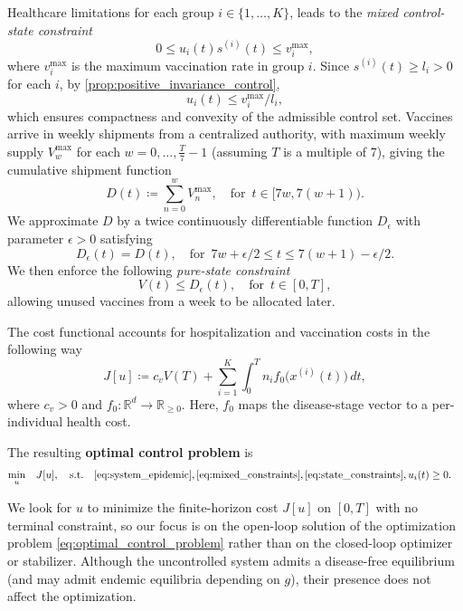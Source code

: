 \documentclass[letterpaper, 10 pt, conference]{ieeeconf}
\newcommand{\fori}[1]{#1 \in \{1,\dots, K\}}
\begin{document}
Healthcare limitations for each group $\fori{i}$, leads to the {\it mixed control-state constraint}
\begin{equation}
    \label{eq:mixed_constraints}
    0 \le u_i(t) s^{(i)}(t) \le v_i^{\max},
\end{equation}
where $v_i^{\max}$ is the maximum vaccination rate in group $i$. 
Since $s^{(i)}(t) \geq l_i > 0$ for each $i$, by \autoref{prop:positive_invariance_control},
\begin{equation}
    \label{eq:compactness_u}
    u_i(t) \leq v_i^{\max}/l_i,
\end{equation}
which ensures compactness and convexity of the admissible control set.
Vaccines arrive in weekly shipments from a centralized authority, with maximum weekly supply $V_w^{\max}$ for each $w=0,\dots, \frac{T}{7}-1$ (assuming $T$ is a multiple of 7), giving the cumulative shipment function
\[
D(t) \coloneqq \sum_{n=0}^{w}V_n^{\max}, \quad \text{for }\, t\in [7w,7(w+1)).
\]
We approximate $D$ by a twice continuously differentiable function $D_{\epsilon}$ with parameter $\epsilon>0$ satisfying
\[
D_{\epsilon}(t)=D(t),\quad \text{for }\, 7w+\epsilon/2\le t\le 7(w+1)-\epsilon/2.
\]
We then enforce the following {\it pure-state constraint} 
\begin{equation}
    \label{eq:state_constraints}
    V(t) \leq D_{\epsilon}(t), \quad \text{for }\,  t \in [0,T],
\end{equation}
allowing unused vaccines from a week to be allocated later.

The cost functional accounts for hospitalization and vaccination costs in the following way
\begin{equation}
    \label{eq:cost_function}
    J[u] \coloneqq c_v V(T) + \sum_{i=1}^{K} \int_{0}^{T} n_i f_0\bigl(x^{(i)}(t)\bigr)\,dt,
\end{equation}
where $c_v > 0$ and $f_0: \mathbb{R}^d \to \mathbb{R}_{\ge0}$.
Here, $f_0$ maps the disease-stage vector to a per-individual health cost.

The resulting {\bf optimal control problem} is
\begin{equation}
    \label{eq:optimal_control_problem}
    \begin{aligned}
        \min_{u} \quad & J[u], \quad \text{s.t.} \quad \eqref{eq:system_epidemic}, \eqref{eq:mixed_constraints}, \eqref{eq:state_constraints}, u_i(t) \geq 0.
    \end{aligned}
\end{equation}

We look for $u$ to minimize the finite-horizon cost $J[u]$ on $[0,T]$ with no terminal constraint, so our focus is on the open-loop solution of the optimization problem \eqref{eq:optimal_control_problem} rather than on the closed-loop optimizer or stabilizer.  
Although the uncontrolled system admits a disease-free equilibrium (and may admit endemic equilibria depending on $g$), their presence does not affect the optimization.
\end{document}
